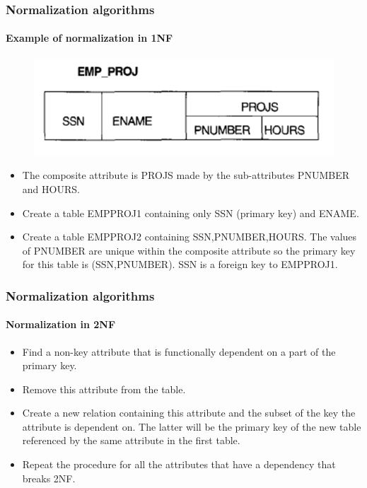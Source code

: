 \documentclass{beamer}
\begin{document}
\begin{frame}
	\frametitle{Normalization algorithms}
	\framesubtitle{Example of normalization in 1NF}
	
	\begin{figure}
		\includegraphics[scale=0.5]{img/normalization/norm14}
	\end{figure}
	
	\begin{itemize}
		\item The composite attribute is PROJS made by the sub-attributes PNUMBER and HOURS.
		\item Create a table EMP\textunderscore PROJ1 containing only SSN (primary key) and ENAME.
		\item Create a table EMP\textunderscore PROJ2 containing SSN,PNUMBER,HOURS. The values of PNUMBER are unique within the composite attribute so the primary key for this table is (SSN,PNUMBER). SSN is a foreign key to EMP\textunderscore PROJ1.	
	\end{itemize}
\end{frame}

\begin{frame}
	\frametitle{Normalization algorithms}
	\framesubtitle{Normalization in 2NF}
	
	\begin{itemize}
		\item Find a non-key attribute that is functionally dependent on a part of the primary key.
		\item Remove this attribute from the table.
		\item Create a new relation containing this attribute and the subset of the key the attribute is dependent on. The latter will be the primary key of the new table referenced by the same attribute in the first table.
		\item Repeat the procedure for all the attributes that have a dependency that breaks 2NF.		
	\end{itemize}
\end{frame}
\end{document}
